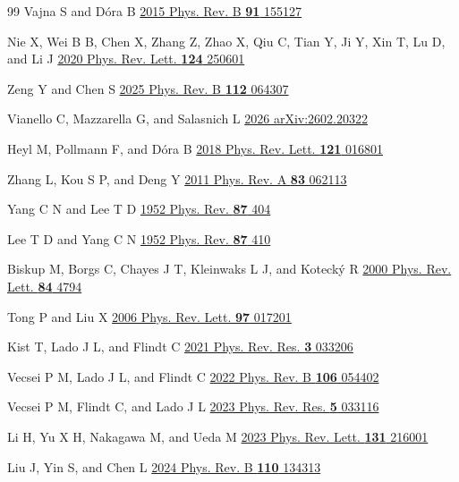 \documentclass[aps,prb,floatfix,superscriptaddress,reprint]{revtex4-2}
\begin{document}
\begin{thebibliography}{99}
Vajna S and D\'{o}ra B \href{https://doi.org/10.1103/PhysRevB.91.155127}{2015 Phys. Rev. B \textbf{91} 155127}

Nie X, Wei B B, Chen X, Zhang Z, Zhao X, Qiu C, Tian Y, Ji Y, Xin T, Lu D, and Li J \href{https://doi.org/10.1103/PhysRevLett.124.250601}{2020 Phys. Rev. Lett. \textbf{124} 250601}

Zeng Y and Chen S \href{https://doi.org/10.1103/srx7-cpl4}{2025 Phys. Rev. B \textbf{112} 064307}

Vianello C, Mazzarella G, and Salasnich L \href{https://doi.org/10.48550/arXiv.2602.20322}{2026 arXiv:2602.20322}

Heyl M, Pollmann F, and D\'{o}ra B \href{https://doi.org/10.1103/PhysRevLett.121.016801}{2018 Phys. Rev. Lett. \textbf{121} 016801}

Zhang L, Kou S P, and Deng Y \href{https://doi.org/10.1103/PhysRevA.83.062113}{2011 Phys. Rev. A \textbf{83} 062113}

Yang C N and Lee T D \href{https://doi.org/10.1103/PhysRev.87.404}{1952 Phys. Rev. \textbf{87} 404}

Lee T D and Yang C N \href{https://doi.org/10.1103/PhysRev.87.410}{1952 Phys. Rev. \textbf{87} 410}

Biskup M, Borgs C, Chayes J T, Kleinwaks L J, and Koteck\'{y} R \href{https://doi.org/10.1103/PhysRevLett.84.4794}{2000 Phys. Rev. Lett. \textbf{84} 4794}

Tong P and Liu X \href{https://doi.org/10.1103/PhysRevLett.97.017201}{2006 Phys. Rev. Lett. \textbf{97} 017201}

Kist T, Lado J L, and Flindt C \href{https://doi.org/10.1103/PhysRevResearch.3.033206}{2021 Phys. Rev. Res. \textbf{3} 033206}

Vecsei P M, Lado J L, and Flindt C \href{https://doi.org/10.1103/PhysRevB.106.054402}{2022 Phys. Rev. B \textbf{106} 054402}

Vecsei P M, Flindt C, and Lado J L \href{https://doi.org/10.1103/PhysRevResearch.5.033116}{2023 Phys. Rev. Res. \textbf{5} 033116}

Li H, Yu X H, Nakagawa M, and Ueda M \href{https://doi.org/10.1103/PhysRevLett.131.216001}{2023 Phys. Rev. Lett. \textbf{131} 216001}

Liu J, Yin S, and Chen L \href{https://doi.org/10.1103/PhysRevB.110.134313}{2024 Phys. Rev. B \textbf{110} 134313}


\end{thebibliography}
\end{document}
